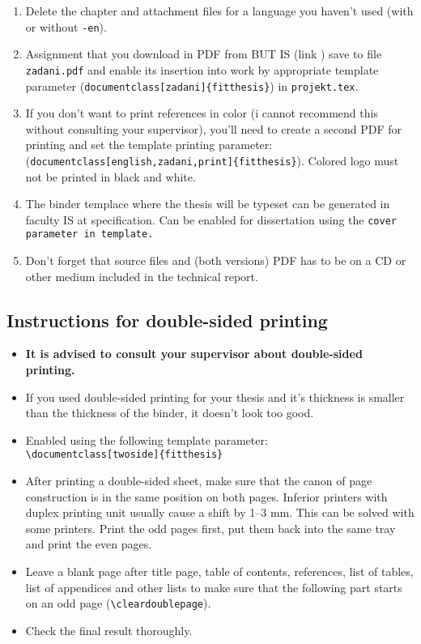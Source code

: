 \begin{enumerate}
  \item Delete the chapter and attachment files for a language you haven't used (with or without \texttt{-en}).
  \item Assignment that you download in PDF from BUT IS (link ) save to file \texttt{zadani.pdf} and enable its insertion into work by appropriate template parameter (\verb|document|\verb|class[zadani]{fitthesis}|) in \texttt{projekt.tex}.
  \item If you don't want to print references in color (i cannot recommend this without consulting your supervisor), you'll need to create a second PDF for printing and set the template printing parameter:\\ (\verb|document|\verb|class[english,zadani,print]{fitthesis}|). Colored logo must not be printed in black and white.
  \item The binder templace where the thesis will be typeset can be generated in faculty IS at specification. Can be enabled for dissertation using the \tt cover \rm parameter in template.
  \item Don't forget that source files and (both versions) PDF has to be on a CD or other medium included in the technical report.
\end{enumerate}

\subsection*{Instructions for double-sided printing}
\begin{itemize}
\item \textbf{It is advised to consult your supervisor about double-sided printing.}
\item If you used double-sided printing for your thesis and it's thickness is smaller than the thickness of the binder, it doesn't look too good.
\item Enabled using the following template parameter:\\ \verb|\document|\verb|class[twoside]{fitthesis}|
\item After printing a double-sided sheet, make sure that the canon of page construction is in the same position on both pages. Inferior printers with duplex printing unit usually cause a shift by 1--3 mm. This can be solved with some printers. Print the odd pages first, put them back into the same tray and print the even pages.
\item Leave a blank page after title page, table of contents, references, list of tables, list of appendices and other lists to make sure that the following part starts on an odd page (\texttt{\textbackslash cleardoublepage}).
\item Check the final result thoroughly.
\end{itemize}

